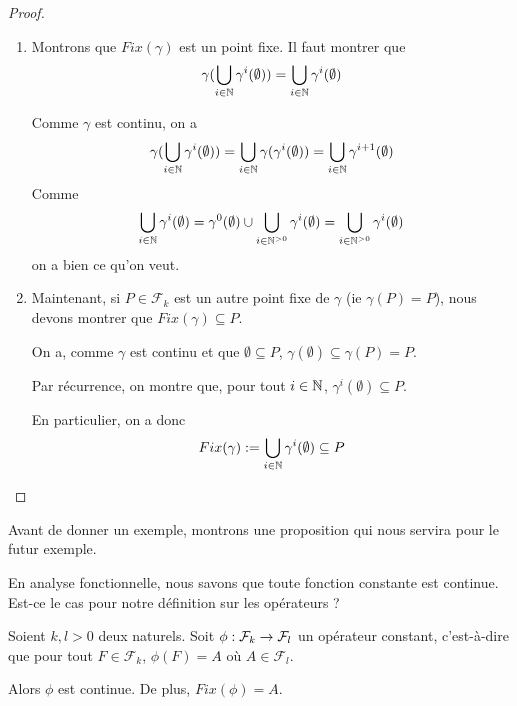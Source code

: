\ifdefined\outputproof
\begin{proof}
	\begin{enumerate}
		\item Montrons que $Fix(\gamma)$ est un point fixe. Il faut montrer que
			\begin{equation}
				\gamma(\bigcup_{i \in \mathbb{N}} \gamma^{i}(\emptyset)) = \bigcup_{i \in
				\mathbb{N}} \gamma^{i}(\emptyset)
			\end{equation}

			Comme $\gamma$ est continu, on a
			\begin{equation}
				\gamma(\bigcup_{i \in \mathbb{N}} \gamma^{i}(\emptyset)) = \bigcup_{i \in
				\mathbb{N}} \gamma(\gamma^{i}(\emptyset)) = \bigcup_{i \in
				\mathbb{N}} \gamma^{i + 1}(\emptyset)
			\end{equation}
			Comme
			\begin{equation}
				\bigcup_{i \in \mathbb{N}} \gamma^{i}(\emptyset) = \gamma^{0}(\emptyset)
				\cup \bigcup_{i \in \mathbb{N}^{> 0}} \gamma^{i}(\emptyset) = \bigcup_{i
					\in \mathbb{N}^{> 0}} \gamma^{i}(\emptyset)
			\end{equation}
			on a bien ce qu'on veut.

		\item Maintenant, si $P \in \mathcal{F}_{k}$ est un autre point fixe de $\gamma$ (ie $\gamma(P) =
			P$), nous devons montrer que $Fix(\gamma) \subseteq P$.

			On a, comme $\gamma$ est continu et que $\emptyset \subseteq P$,
			$\gamma(\emptyset) \subseteq \gamma(P) = P$.

			Par récurrence, on montre que, pour tout $i \in \mathbb{N}$,
			$\gamma^{i}(\emptyset) \subseteq P$.

			En particulier, on a donc
			\begin{equation}
				Fix(\gamma) := \bigcup_{i \in \mathbb{N}} \gamma^{i}(\emptyset) \subseteq
				P
			\end{equation}
	\end{enumerate}
	\end{proof}
\fi

Avant de donner un exemple, montrons une proposition qui nous servira pour le
futur exemple.

En analyse fonctionnelle, nous savons que toute fonction constante est
continue. Est-ce le cas pour notre définition sur les opérateurs ?

\begin{proposition}
	Soient $k, l > 0$ deux naturels.
	Soit $\phi : \mathcal{F}_{k} \rightarrow \mathcal{F}_{l}$ un opérateur
	constant, c'est-à-dire que pour tout $F \in \mathcal{F}_{k}$, $\phi(F) = A$
	où $A \in \mathcal{F}_{l}$.

	Alors $\phi$ est continue. De plus, $Fix(\phi) = A$.
\end{proposition}

